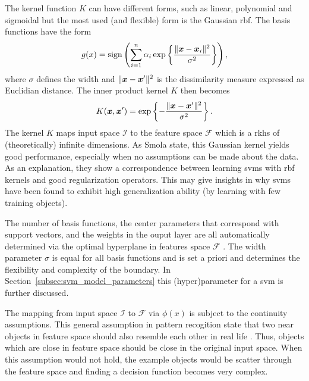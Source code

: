 The kernel function $K$ can have different forms, such as linear, polynomial and sigmoidal but the most used (and flexible) form is the Gaussian \gls{rbf}.
The basis functions have the form
\begin{equation}
  g(x) = \operatorname*{sign} \left(  \sum_{i=1}^{n} \alpha_i \operatorname*{exp} \left\{ \frac{\rVert \vectorsym{x} - \vectorsym{x}_i \rVert ^2}{\sigma^2} \right\} \right),
\end{equation}
where $\sigma$ defines the width and $\rVert \vectorsym{x} - \vectorsym{x}' \rVert ^2$ is the dissimilarity measure expressed as Euclidian distance.
The inner product kernel $K$ then becomes
\begin{equation}
  K(\vectorsym{x}, \vectorsym{x}') = \operatorname*{exp} \left\{ - \frac{ \rVert \vectorsym{x} - \vectorsym{x}' \rVert ^2}{\sigma^2} \right\}.
\end{equation}
The kernel $K$ maps input space $\mathcal{I}$ to the feature space $\mathcal{F}$ which is a \gls{rkhs} of (theoretically) infinite dimensions.
As Smola \etal \cite{smola1998connection} state, this Gaussian kernel yields good performance, especially when no assumptions can be made about the data.
As an explanation, they show a correspondence between learning \glspl{svm} with \gls{rbf} kernels and good regularization operators.
This may give insights in why \glspl{svm} have been found to exhibit high generalization ability (by learning with few training objects).

The number of basis functions, the center parameters that correspond with support vectors, and the weights in the ouput layer are all automatically determined via the optimal hyperplane in features space $\mathcal{F}$ \cite{cherkassky2007learning}.
The width parameter $\sigma$ is equal for all basis functions and is set a priori and determines the flexibility and complexity of the boundary.
In Section~\ref{subsec:svm_model_parameters} this (hyper)parameter for a \gls{svm} is further discussed.

The mapping from input space $\mathcal{I}$ to $\mathcal{F}$ via $\phi(x)$ is subject to the continuity assumptions.
This general assumption in pattern recogition state that two near objects in feature space should also resemble each other in real life \cite{tax2001one}.
Thus, objects which are close in feature space should be close in the original input space.
When this assumption would not hold, the example objects would be scatter through the feature space and finding a decision function becomes very complex.

